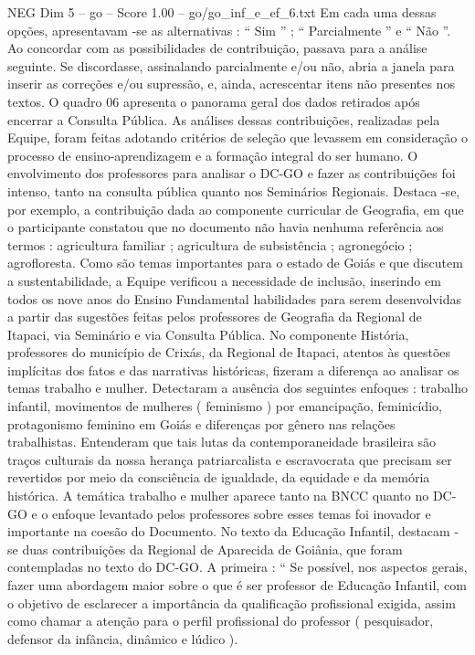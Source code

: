 \begin{textsample}{NEG Dim 5 – go – Score 1.00 – go/go\_inf\_e\_ef\_6.txt}
Em cada uma dessas opções, apresentavam -se as alternativas : “ Sim ” ; “ Parcialmente ” e “ Não ”.
Ao concordar com as possibilidades de contribuição, passava para a análise seguinte.
Se discordasse, assinalando parcialmente e/ou não, abria a janela para inserir as correções e/ou supressão, e, ainda, acrescentar itens não presentes nos textos.
O quadro 06 apresenta o panorama geral dos dados retirados após encerrar a Consulta Pública.
As análises dessas contribuições, realizadas pela Equipe, foram feitas adotando critérios de seleção que levassem em consideração o processo de ensino-aprendizagem e a formação integral do ser humano.
O envolvimento dos professores para analisar o DC-GO e fazer as contribuições foi intenso, tanto na consulta pública quanto nos Seminários Regionais.
Destaca -se, por exemplo, a contribuição dada ao componente curricular de Geografia, em que o participante constatou que no documento não havia nenhuma referência aos termos : agricultura familiar ; agricultura de subsistência ; agronegócio ; agrofloresta.
Como são temas importantes para o estado de Goiás e que discutem a sustentabilidade, a Equipe verificou a necessidade de inclusão, inserindo em todos os nove anos do Ensino Fundamental habilidades para serem desenvolvidas a partir das sugestões feitas pelos professores de Geografia da Regional de Itapaci, via Seminário e via Consulta Pública.
No componente História, professores do município de Crixás, da Regional de Itapaci, atentos às questões implícitas dos fatos e das narrativas históricas, fizeram a diferença ao analisar os temas trabalho e mulher.
Detectaram a ausência dos seguintes enfoques : trabalho infantil, movimentos de mulheres ( feminismo ) por emancipação, feminicídio, protagonismo feminino em Goiás e diferenças por gênero nas relações trabalhistas.
Entenderam que tais lutas da contemporaneidade brasileira são traços culturais da nossa herança patriarcalista e escravocrata que precisam ser revertidos por meio da consciência de igualdade, da equidade e da memória histórica.
A temática trabalho e mulher aparece tanto na BNCC quanto no DC-GO e o enfoque levantado pelos professores sobre esses temas foi inovador e importante na coesão do Documento.
No texto da Educação Infantil, destacam -se duas contribuições da Regional de Aparecida de Goiânia, que foram contempladas no texto do DC-GO.
A primeira : “ Se possível, nos aspectos gerais, fazer uma abordagem maior sobre o que é ser professor de Educação Infantil, com o objetivo de esclarecer a importância da qualificação profissional exigida, assim como chamar a atenção para o perfil profissional do professor ( pesquisador, defensor da infância, dinâmico e lúdico ).

\end{textsample}
